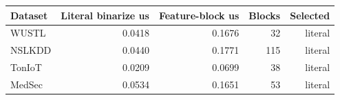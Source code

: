 \begin{tabular}{lrrrr}
\toprule
Dataset & Literal binarize us & Feature-block us & Blocks & Selected \\
\midrule
WUSTL & 0.0418 & 0.1676 & 32 & literal \\
NSLKDD & 0.0440 & 0.1771 & 115 & literal \\
TonIoT & 0.0209 & 0.0699 & 38 & literal \\
MedSec & 0.0534 & 0.1651 & 53 & literal \\
\bottomrule
\end{tabular}
